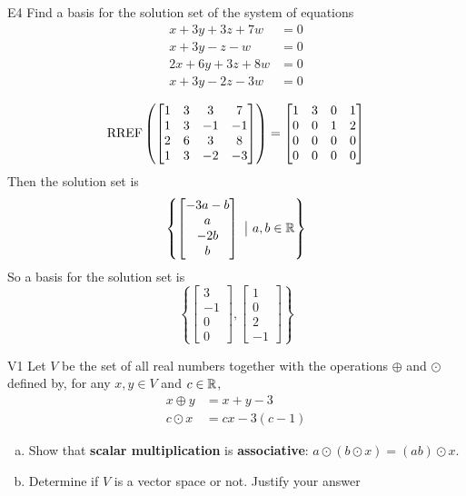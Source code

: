 \documentclass{sbgLAquiz}
\begin{document}
\begin{extract}\newpage\end{extract}
\begin{problem}{E4}
Find a basis for the solution set of the system of equations
\begin{align*}
x+3y+3z+7w &= 0 \\
 x+3y-z-w &= 0 \\
  2x+6y+3z+8w &= 0 \\
   x+3y-2z-3w &= 0
\end{align*}
\end{problem}
\begin{solution}
$$\operatorname{RREF}\left(\begin{bmatrix} 1 & 3 & 3 & 7 \\ 1 & 3 & -1 & -1 \\ 2 & 6 & 3 & 8 \\ 1 & 3 & -2 & -3 \end{bmatrix}\right) = \begin{bmatrix} 1 & 3 & 0 & 1 \\ 0 & 0 & 1 & 2 \\ 0 & 0 & 0 & 0 \\ 0 & 0 & 0 & 0 \end{bmatrix}$$
Then the solution set is
$$\left\{ \begin{bmatrix} -3a-b \\ a \\ -2b \\ b \end{bmatrix}\ \big|\ a,b \in \mathbb{R}\right\}$$
So a basis for the solution set is $$ \left\{ \begin{bmatrix} 3 \\ -1 \\ 0 \\ 0 \end{bmatrix} , \begin{bmatrix} 1\\0 \\ 2 \\ -1 \end{bmatrix} \right\} $$
\end{solution}


\begin{problem}{V1}
Let $V$ be the  set of all real numbers together with the operations $\oplus$ and $\odot$ defined by, for any $x,y \in V$ and $c \in \mathbb{R}$,
\begin{align*}
x\oplus y  &= x+y-3 \\
c \odot x &= cx-3(c-1)
\end{align*}
\begin{enumerate}[(a)]
\item Show that \textbf{scalar multiplication} is
      \textbf{associative}: \(a\odot(b\odot x)=(ab)\odot x\).
\item Determine if $V$ is a vector space or not.  Justify your answer
\end{enumerate}
\end{problem}
\end{document}
